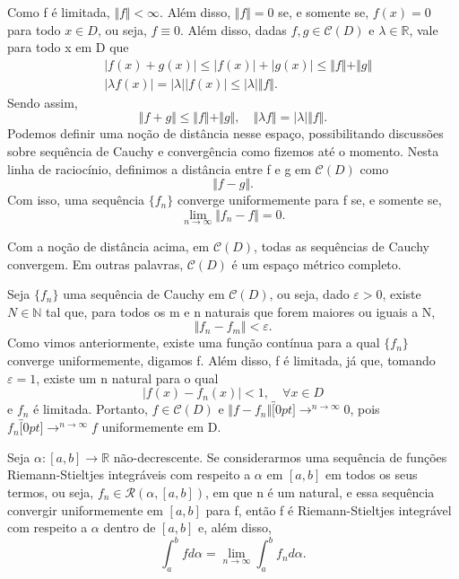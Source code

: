 \documentclass[../analysis_notes.tex]{subfiles}
\begin{document}
Como f é limitada, \(\Vert f \Vert<\infty\). Além disso, \(\Vert f \Vert=0\) se, e somente se, \(f(x)=0\) para todo \(x\in D\), ou seja, \(f\equiv 0\). Além disso, dadas \(f, g\in \mathcal{C}(D)\) e \(\lambda \in \mathbb{R}\), vale para todo x em D que
\begin{align*}
	 & |f(x)+g(x)|\leq |f(x)|+|g(x)|\leq \Vert f \Vert+\Vert g \Vert \\
	 & |\lambda f(x)|=|\lambda ||f(x)|\leq |\lambda |\Vert f \Vert.
\end{align*}
Sendo assim,
\[
	\Vert f+g \Vert\leq \Vert f \Vert+\Vert g \Vert,\quad \Vert \lambda f \Vert=|\lambda |\Vert f \Vert.
\]
Podemos definir uma noção de distância nesse espaço, possibilitando discussões sobre sequência de Cauchy e convergência como fizemos até o momento. Nesta linha de raciocínio, definimos a distância entre f e g em \(\mathcal{C}(D)\) como
\[
	\Vert f-g \Vert.
\]
Com isso, uma sequência \(\{f_{n}\}\) converge uniformemente para f se, e somente se,
\[
	\lim_{n\to \infty}\Vert f_{n}-f \Vert=0.
\]
\begin{theorem*}
	Com a noção de distância acima, em \(\mathcal{C}(D)\), todas as sequências de Cauchy convergem. Em outras palavras, \(\mathcal{C}(D)\) é um espaço métrico completo.
\end{theorem*}
\begin{proof*}
	Seja \(\{f_{n}\}\) uma sequência de Cauchy em \(\mathcal{C}(D)\), ou seja, dado \(\varepsilon >0\), existe \(N\in \mathbb{N}\) tal que, para todos os m e n naturais que forem maiores ou iguais a N,
	\[
		\Vert f_{n}-f_{m} \Vert<\varepsilon.
	\]
	Como vimos anteriormente, existe uma função contínua para a qual \(\{f_{n}\}\) converge uniformemente, digamos f. Além disso, f é limitada, já que, tomando \(\varepsilon = 1\), existe um n natural para o qual
	\[
		|f(x)-f_{n}(x)|<1,\quad \forall x\in D
	\]
	e \(f_{n}\) é limitada. Portanto, \(f\in \mathcal{C}(D)\) e \(\Vert f-f_{n} \Vert\overbracket[0pt]{\longrightarrow}^{n\to \infty}0\), pois \(f_{n}\overbracket[0pt]{\longrightarrow}^{n\to \infty}f\) uniformemente em D. \qedsymbol
\end{proof*}
\begin{theorem*}
	Seja \(\alpha :[a, b]\rightarrow \mathbb{R}\) não-decrescente. Se considerarmos uma sequência de funções Riemann-Stieltjes integráveis com respeito a \(\alpha \) em \([a, b]\) em todos os seus termos, ou seja, \(f_{n}\in \mathcal{R}(\alpha, [a, b])\), em que n é um natural, e essa sequência convergir uniformemente em \([a, b]\) para f, então f é Riemann-Stieltjes integrável com respeito a \(\alpha \) dentro de \([a, b]\) e, além disso,
	\[
		\int_{a}^{b}fd\alpha = \lim_{n\to \infty}\int_{a}^{b}f_{n}d\alpha .
	\]
\end{theorem*}
\end{document}

